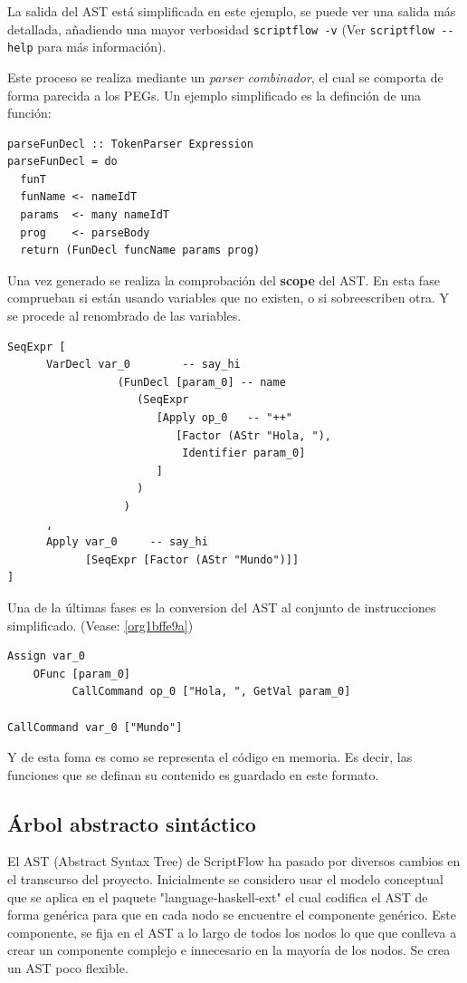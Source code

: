 \documentclass[11pt]{article}
\begin{document}
La salida del AST está simplificada en este ejemplo, se puede ver una salida más detallada,
añadiendo una mayor verbosidad \texttt{scriptflow -v} (Ver \texttt{scriptflow -{}-help} para más información).

Este proceso se realiza mediante un \emph{parser combinador}, el cual se comporta de
forma parecida a los PEGs. Un ejemplo simplificado es la definción de
una función:

\begin{verbatim}
parseFunDecl :: TokenParser Expression
parseFunDecl = do
  funT
  funName <- nameIdT
  params  <- many nameIdT
  prog    <- parseBody
  return (FunDecl funcName params prog)
\end{verbatim}

Una vez generado se realiza la comprobación del \textbf{scope} del AST. En esta fase
comprueban si están usando variables que no existen, o si sobreescriben
otra. Y se procede al renombrado de las variables.

\begin{verbatim}
SeqExpr [
      VarDecl var_0        -- say_hi
                 (FunDecl [param_0] -- name
                    (SeqExpr
                       [Apply op_0   -- "++"
                          [Factor (AStr "Hola, "),
                           Identifier param_0]
                       ]
                    )
                  )
      ,
      Apply var_0     -- say_hi
            [SeqExpr [Factor (AStr "Mundo")]]
]
\end{verbatim}

Una de la últimas fases es la conversion del AST al conjunto de
instrucciones simplificado. (Vease: \ref{org1bffe9a})

\begin{verbatim}
Assign var_0
    OFunc [param_0]
          CallCommand op_0 ["Hola, ", GetVal param_0]

CallCommand var_0 ["Mundo"]
\end{verbatim}

Y de esta foma es como se representa el código en memoria. Es decir, las
funciones que se definan su contenido es guardado en este formato.

\subsection{Árbol abstracto sintáctico}
\label{sec:org90c1648}

El AST (Abstract Syntax Tree) de ScriptFlow ha pasado por diversos cambios en el transcurso del proyecto. Inicialmente
se considero usar el modelo conceptual que se aplica en el paquete "language-haskell-ext" el cual codifica el AST de forma genérica
para que en cada nodo se encuentre el componente genérico. Este componente, se fija en el AST a lo largo de todos los nodos lo que
que conlleva a crear un componente complejo e innecesario en la mayoría de los nodos. Se crea un AST poco flexible.
\end{document}
